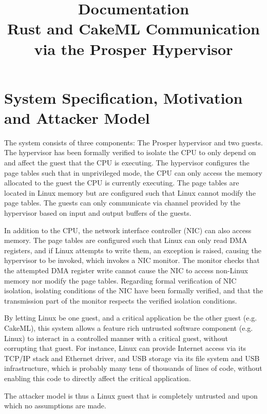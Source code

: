 \documentclass[11pt, a4paper]{article}
\begin{document}
\title{\textbf{Documentation}\\ Rust and CakeML Communication via the Prosper Hypervisor}
\maketitle

\pagebreak

\section*{System Specification, Motivation and Attacker Model}
The system consists of three components: The Prosper hypervisor and two guests.
The hypervisor has been formally verified to isolate the CPU to only depend on
and affect the guest that the CPU is executing. The hypervisor configures the
page tables such that in unprivileged mode, the CPU can only access the memory
allocated to the guest the CPU is currently executing. The page tables are
located in Linux memory but are configured such that Linux cannot modify the
page tables. The guests can only communicate via channel provided by the
hypervisor based on input and output buffers of the guests.

In addition to the CPU, the network interface controller (NIC) can also access
memory. The page tables are configured such that Linux can only read DMA
registers, and if Linux attempts to write them, an exception is raised, causing
the hypervisor to be invoked, which invokes a NIC monitor. The monitor checks
that the attempted DMA register write cannot cause the NIC to access non-Linux
memory nor modify the page tables. Regarding formal verification of NIC
isolation, isolating conditions of the NIC have been formally verified, and that
the transmission part of the monitor respects the verified isolation conditions.

By letting Linux be one guest, and a critical application be the other guest
(e.g. CakeML), this system allows a feature rich untrusted software component
(e.g. Linux) to interact in a controlled manner with a critical guest, without
corrupting that guest. For instance, Linux can provide Internet access via its
TCP/IP stack and Ethernet driver, and USB storage via its file system and USB
infrastructure, which is probably many tens of thousands of lines of code,
without enabling this code to directly affect the critical application.

The attacker model is thus a Linux guest that is completely untrusted and upon
which no assumptions are made.
\end{document}
